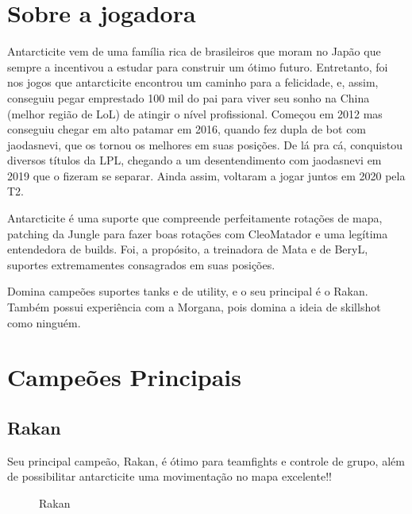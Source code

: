\begin{multicols}{2}
	\section*{Sobre a jogadora}
	Antarcticite vem de uma família rica de brasileiros que moram no Japão que sempre a incentivou a estudar para construir um ótimo futuro. Entretanto, foi nos jogos que antarcticite encontrou um caminho para a felicidade, e, assim, conseguiu pegar emprestado 100 mil do pai para viver seu sonho na China (melhor região de LoL) de atingir o nível profissional. Começou em 2012 mas conseguiu chegar em alto patamar em 2016, quando fez dupla de bot com jaodasnevi, que os tornou os melhores em suas posições. De lá pra cá, conquistou diversos títulos da LPL, chegando a um desentendimento com jaodasnevi em 2019 que o fizeram se separar. Ainda assim, voltaram a jogar juntos em 2020 pela T2.
	
	Antarcticite é uma suporte que compreende perfeitamente rotações de mapa, patching da Jungle para fazer boas rotações com CleoMatador e uma legítima entendedora de builds\cite{kou2}. Foi, a propósito, a treinadora de Mata e de BeryL, suportes extremamentes consagrados em suas posições. 
	
	Domina campeões suportes tanks e de utility, e o seu principal é o Rakan. Também possui experiência com a Morgana, pois domina a ideia de skillshot como ninguém.
	
	\section*{Campeões Principais}
	\subsection*{Rakan}
	Seu principal campeão, Rakan, é ótimo para teamfights e controle de grupo, além de possibilitar antarcticite uma movimentação no mapa excelente!!
	\begin{figure}[H]
		\centering
		\caption{Rakan}
		\label{fig:fig9}
	\end{figure}
	

\end{multicols}
